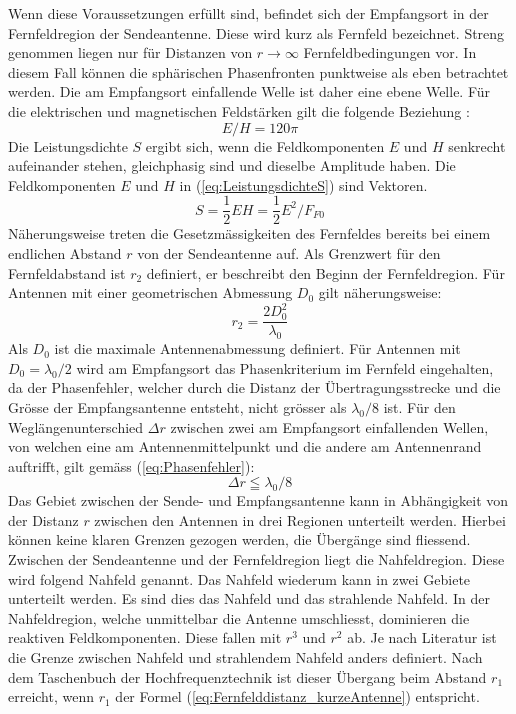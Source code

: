  Wenn diese Voraussetzungen erfüllt sind, befindet sich der Empfangsort in der Fernfeldregion der Sendeantenne. Diese wird kurz als Fernfeld bezeichnet. Streng genommen liegen nur für Distanzen von $r\rightarrow\infty$ Fernfeldbedingungen vor. In diesem Fall können die sphärischen Phasenfronten punktweise als eben betrachtet werden. Die am Empfangsort einfallende Welle ist daher eine ebene Welle. Für die  elektrischen und magnetischen Feldstärken gilt die folgende Beziehung  \cite{meinke1992taschenbuch}:
\begin{equation}
E/H=120\pi\label{eq:WellenimpedanuE/H}
\end{equation}
Die Leistungsdichte $S$ ergibt sich, wenn die Feldkomponenten $E$ und $H$ senkrecht aufeinander stehen, gleichphasig sind und dieselbe Amplitude haben. Die Feldkomponenten $E$ und $H$ in  (\ref{eq:LeistungsdichteS}) sind Vektoren. 
\begin{equation}
S=\dfrac{1}{2}EH=\dfrac{1}{2} E^{2}/F_{F0}\label{eq:LeistungsdichteS}
\end{equation}
Näherungsweise treten die Gesetzmässigkeiten des Fernfeldes bereits bei einem endlichen Abstand $r$ von der Sendeantenne auf. Als Grenzwert für den Fernfeldabstand ist $r_{2}$ definiert, er beschreibt den Beginn der Fernfeldregion. Für Antennen mit einer geometrischen Abmessung $D_{0}$ gilt näherungsweise\cite{meinke1992taschenbuch}:
\begin{equation}
r_{2}=\dfrac{2D_{0}^{2}}{\lambda_{0}} \label{eq:Fernfelddistanz_r2}
\end{equation}
Als $D_{0}$ ist die maximale Antennenabmessung definiert. Für Antennen mit $D_{0}=\lambda_{0}/2$ wird am Empfangsort das Phasenkriterium im Fernfeld eingehalten, da der Phasenfehler, welcher durch die Distanz der Übertragungsstrecke und die Grösse der Empfangsantenne entsteht, nicht grösser als $\lambda_{0}/8$ ist. Für den Weglängenunterschied $\Delta r$ zwischen zwei am Empfangsort einfallenden Wellen, von welchen eine am Antennenmittelpunkt und die andere am Antennenrand auftrifft, gilt gemäss (\ref{eq:Phasenfehler})\cite{meinke1992taschenbuch}:
\begin{equation}
\Delta r\leqq\lambda_{0}/8 \label{eq:Phasenfehler}
\end{equation}
Das Gebiet zwischen der Sende- und Empfangsantenne kann in Abhängigkeit von der Distanz $r$ zwischen den Antennen in drei Regionen unterteilt werden. Hierbei können keine klaren Grenzen gezogen werden, die Übergänge sind fliessend. Zwischen der Sendeantenne und der Fernfeldregion liegt die Nahfeldregion. Diese wird folgend Nahfeld genannt. Das Nahfeld wiederum kann in zwei Gebiete unterteilt werden. Es sind dies das Nahfeld und das strahlende Nahfeld. In der Nahfeldregion, welche unmittelbar die Antenne umschliesst, dominieren die reaktiven Feldkomponenten. Diese fallen mit $r^{3}$ und $r^{2}$ ab. Je nach Literatur ist die Grenze zwischen Nahfeld und strahlendem Nahfeld anders definiert. Nach dem Taschenbuch der Hochfrequenztechnik ist dieser Übergang beim Abstand $r_{1}$ erreicht, wenn $r_{1}$ der Formel (\ref{eq:Fernfelddistanz_kurzeAntenne}) entspricht\cite{meinke1992taschenbuch}.

